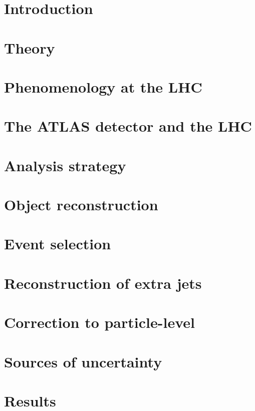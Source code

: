 \documentclass[12pt]{ucbthesis}
\begin{document}
\pagestyle{headings}
\chapter{Introduction}
\label{ch:intro}

\chapter{Theory}
\label{ch:theory}

\chapter{Phenomenology at the LHC}
\label{ch:pheno}


\chapter{The ATLAS detector and the LHC}
\label{ch:atlas}

\chapter{Analysis strategy}
\label{ch:strategy}

\chapter{Object reconstruction}
\label{ch:objects}

\chapter{Event selection}
\label{ch:event}

\chapter{Reconstruction of extra jets}
\label{ch:extrajets}

\chapter{Correction to particle-level}
\label{ch:unfolding}

\chapter{Sources of uncertainty}
\label{ch:syst}

\chapter{Results}
\label{ch:results}

\end{document}
